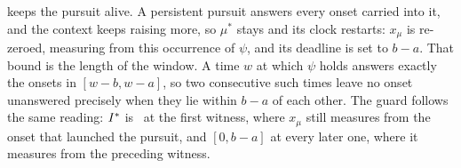  keeps the pursuit alive. A persistent pursuit answers every onset carried
into it, and the context keeps raising more, so $\mu^{\ast}$ stays and its clock restarts:
$x_\mu$ is re-zeroed, measuring from this occurrence of $\psi$, and its deadline is set to
$b-a$. That bound is the length of the window. A time $w$ at which $\psi$ holds answers exactly the
onsets in $[w-b,w-a]$, so two consecutive such times leave no onset unanswered precisely when
they lie within $b-a$ of each other. The guard follows the same reading: $I^{\ast}$ is \kI\ at the
first witness, where $x_\mu$ still measures from the onset that launched the pursuit, and $[0,b-a]$
at every later one, where it measures from the preceding witness. 


%
%

%

